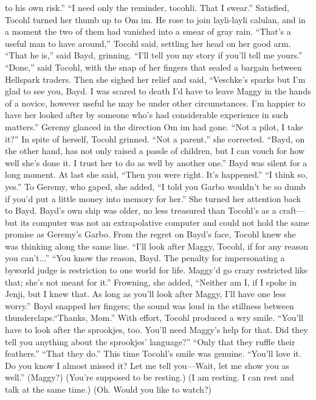 \documentclass[9pt]{article}
\begin{document}
to his own risk.”
“I need only the reminder, tocohli. That I swear.”
Satisfied, Tocohl turned her thumb up to Om im. He rose to join layli-layli calulan, and in a moment
the two of them had vanished into a smear of gray rain.
“That’s a useful man to have around,” Tocohl said, settling her head on her good arm.
“That he is,” said Bayd, grinning. “I’ll tell you my story if you’ll tell me yours.”
“Done,” said Tocohl, with the snap of her fingers that sealed a bargain between Hellspark traders.
Then she sighed her relief and said, “Veschke’s sparks but I’m glad to see you, Bayd. I was scared to
death I’d have to leave Maggy in the hands of a novice, however useful he may be under other
circumstances. I’m happier to have her looked after by someone who’s had considerable experience in
such matters.”
Geremy glanced in the direction Om im had gone. “Not a pilot, I take it?”
In spite of herself, Tocohl grinned. “Not a parent,” she corrected. “Bayd, on the other hand, has not
only raised a passle of children, but I can vouch for how well she’s done it. I trust her to do as well by
another one.”
Bayd was silent for a long moment. At last she said, “Then you were right. It’s happened.”
“I think so, yes.” To Geremy, who gaped, she added, “I told you Garbo wouldn’t be so dumb if
you’d put a little money into memory for her.” She turned her attention back to Bayd. Bayd’s own ship
was older, no less treasured than Tocohl’s as a craft—but its computer was not an extrapolative
computer and could not hold the same promise as Geremy’s Garbo.
From the regret on Bayd’s face, Tocohl knew she was thinking along the same line. “I’ll look after
Maggy, Tocohl, if for any reason you can’t...”
“You know the reason, Bayd. The penalty for impersonating a byworld judge is restriction to one
world for life. Maggy’d go crazy restricted like that; she’s not meant for it.” Frowning, she added,
“Neither am I, if I spoke in Jenji, but I knew that. As long as you’ll look after Maggy, I’ll have one less
worry.”
Bayd snapped her fingers; the sound was loud in the stillness between thunderclaps.“Thanks, Mom.”
With effort, Tocohl produced a wry smile. “You’ll have to look after the sprookjes, too. You’ll need
Maggy’s help for that. Did they tell you anything about the sprookjes’ language?”
“Only that they ruffle their feathers.”
“That they do.” This time Tocohl’s smile was genuine. “You’ll love it. Do you know I almost missed
it? Let me tell you—Wait, let me show you as well.” (Maggy?)
(You’re supposed to be resting.)
(I am resting. I can rest and talk at the same time.)
(Oh. Would you like to watch?)
\end{document}
